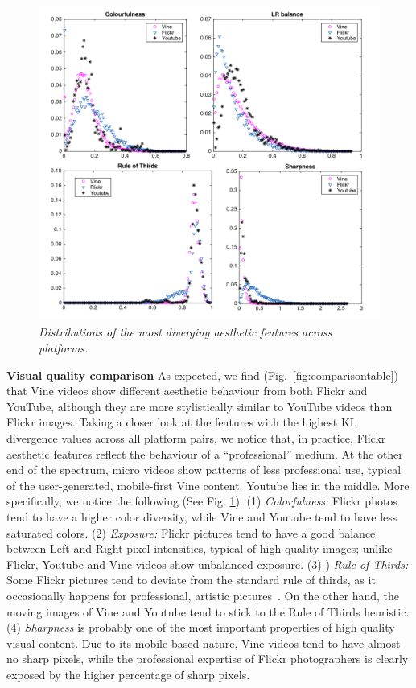 \begin{figure}[!htb]
\centering
\includegraphics[width=\columnwidth]{plots/comparison/aesthetics}
\caption{\textsl{ Distributions of the most diverging aesthetic features across platforms.}}
\label{fig:comparison_aesthetics}
\end{figure}

\noindent\textbf{Visual quality comparison} 
As expected, we find (Fig.~\ref{fig:comparisontable})  that Vine videos show different aesthetic behaviour from both Flickr and YouTube, although they are more stylistically similar to YouTube videos than Flickr images. Taking a closer look at the features with the highest KL divergence values across all platform pairs, we notice that, in practice, Flickr aesthetic features reflect the behaviour of a ``professional'' medium. At the other end of the spectrum, micro videos show patterns of less professional use, typical  of the  user-generated, mobile-first Vine content. Youtube lies in the middle. More specifically, we notice the following (See Fig. \ref{fig:comparison_aesthetics}). (1) \emph{Colorfulness:}  Flickr photos tend to have a higher color diversity, while Vine and Youtube tend to have less saturated colors. (2) \emph{Exposure:}  Flickr pictures tend to have a good balance between Left and Right  pixel intensities, typical of high quality images; unlike Flickr, Youtube and Vine videos show unbalanced exposure. (3) ) \emph{Rule of Thirds:}  Some Flickr pictures tend to deviate from the standard rule of thirds, as it occasionally happens for professional, artistic pictures~\cite{freeman2007photographer}. On the other hand, the moving images of Vine and Youtube tend to stick to the Rule of Thirds heuristic. (4) \emph{Sharpness} is probably one of the most important properties of high quality visual content. Due to its mobile-based nature, Vine videos tend to have almost no sharp pixels, while the professional expertise of Flickr photographers is clearly exposed by the higher percentage of sharp pixels.

